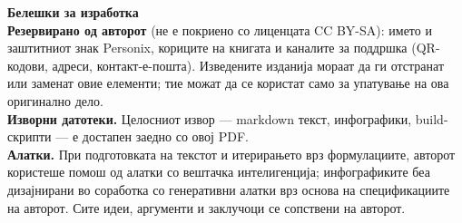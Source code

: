 \clearpage
\thispagestyle{empty}
\begin{flushleft}\small\sffamily
\textbf{Белешки за изработка}\\[1.2em]

\textbf{Резервирано од авторот} (не е покриено со лиценцата CC BY-SA): името
и заштитниот знак Personix, кориците на книгата и каналите за поддршка (QR-кодови,
адреси, контакт-е-пошта). Изведените изданија мораат да ги отстранат или заменат
овие елементи; тие можат да се користат само за упатување на ова оригинално дело.\\[1.2em]

\textbf{Изворни датотеки.} Целосниот извор --- markdown текст, инфографики,
build-скрипти --- е достапен заедно со овој PDF.\\[1.2em]

\textbf{Алатки.} При подготовката на текстот и итерирањето врз формулациите,
авторот користеше помош од алатки со вештачка интелигенција; инфографиките беа
дизајнирани во соработка со генеративни алатки врз основа на спецификациите на
авторот. Сите идеи, аргументи и заклучоци се сопствени на авторот.
\end{flushleft}
\clearpage
